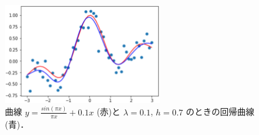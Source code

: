 \documentclass[fleqn]{jsarticle}
\begin{document}
\begin{figure}[h]
  \begin{center}
    \includegraphics[width=0.6\textwidth]{figs/kernel_redge_basic.eps}
  \end{center}
  \caption{曲線 $y=\frac{sin(\pi x)}{\pi x} + 0.1x$ (赤)と $\lambda=0.1$, $h=0.7$ のときの回帰曲線(青)．}
\end{figure}
\end{document}
